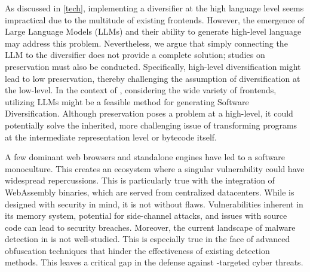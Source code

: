 \begin{strategy}
    As discussed in \autoref{tech}, implementing a diversifier at the high language level seems impractical due to the multitude of existing frontends.
    However, the emergence of Large Language Models (LLMs) and their ability to generate high-level language may address this problem. 
    Nevertheless, we argue that simply connecting the LLM to the diversifier does not provide a complete solution; studies on preservation must also be conducted.
    Specifically, high-level diversification might lead to low preservation, thereby challenging the assumption of diversification at the low-level.
    In the context of \Wasm, considering the wide variety of frontends, utilizing LLMs might be a feasible method for generating Software Diversification.
    Although preservation poses a problem at a high-level, it could potentially solve the inherited, more challenging issue of transforming programs at the intermediate representation level or \Wasm bytecode itself.
 
\end{strategy}



A few dominant web browsers and standalone engines have led to a software monoculture.
This creates an ecosystem where a singular vulnerability could have widespread repercussions.
This is particularly true with the integration of WebAssembly binaries, which are served from centralized datacenters. 
While \Wasm is designed with security in mind, it is not without flaws.
Vulnerabilities inherent in its memory system, potential for side-channel attacks, and issues with source code can lead to security breaches. 
Moreover, the current landscape of malware detection in \Wasm is not well-studied.
This is especially true in the face of advanced obfuscation techniques that hinder the effectiveness of existing detection methods.
This leaves a critical gap in the defense against \Wasm-targeted cyber threats.
